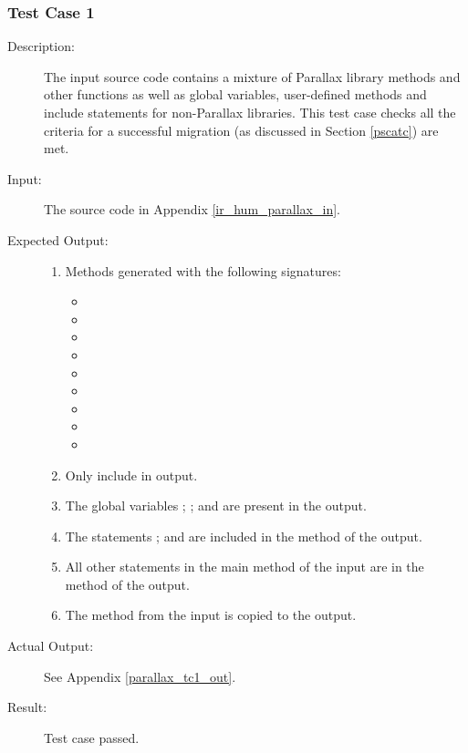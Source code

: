 \documentclass{UoYCSproject}
\begin{document}
\subsubsection{Test Case 1} \label{parallax_tc1}
\begin{description}
\item[Description:] The input source code contains a mixture of Parallax library methods and other functions as well as global variables, user-defined methods and include statements for non-Parallax libraries. This test case checks all the criteria for a successful migration (as discussed in Section \ref{pscatc}) are met.
\item[Input:] The source code in Appendix \ref{ir_hum_parallax_in}.
\item[Expected Output:] 
\begin{enumerate}
\item Methods generated with the following signatures:
\begin{itemize}
\item {}
\item {}
\item {}
\item {}
\item {}
\item {}
\item {}
\item {}
\item {}
\end{itemize}
\item Only  include in output.
\item The global variables ; ;  and  are present in the output.
\item The statements ;  and  are included in the  method of the output. 
\item All other statements in the main method of the input are in the  method of the output. 
\item The  method from the input is copied to the output.
\end{enumerate}
\item[Actual Output:] See Appendix \ref{parallax_tc1_out}.
\item[Result:] Test case passed.
\end{description}
\end{document}
